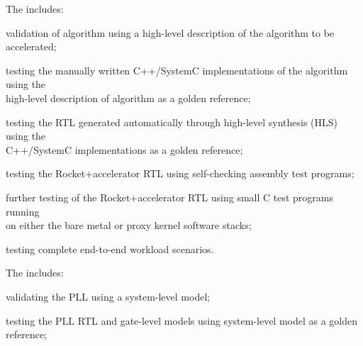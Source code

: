 \begin{cbxlist}{1.5em}{1em}{1em}
\begin{cbxlist}[--]{1.5em}{0em}{0em}
    \end{cbxlist}

 \item The  includes:

    \smallskip
    \begin{cbxlist}[--]{1.5em}{0em}{0em}
      \raggedright

      \item validation of algorithm using a high-level description of the
         algorithm to be accelerated;

      \item testing the manually written C++/SystemC implementations of
         the algorithm using the \\\hspace{0.5em}high-level description
         of algorithm as a golden reference;

      \item testing the RTL generated automatically through high-level
         synthesis (HLS) using the \\\hspace{0.5em}C++/SystemC
         implementations as a golden reference;

      \item testing the Rocket+accelerator RTL using self-checking
         assembly test programs;

      \item further testing of the Rocket+accelerator RTL using small C
         test programs running \\\hspace{0.5em}on either the bare metal
         or proxy kernel software stacks;

      \item testing complete end-to-end workload scenarios.

    \end{cbxlist}

 \item The  includes:

    \smallskip
    \begin{cbxlist}[--]{1.5em}{0em}{0em}
      \raggedright

      \item validating the PLL using a system-level model;

      \item testing the PLL RTL and gate-level models using system-level
         model as a golden reference;


\end{cbxlist}
\end{cbxlist}
